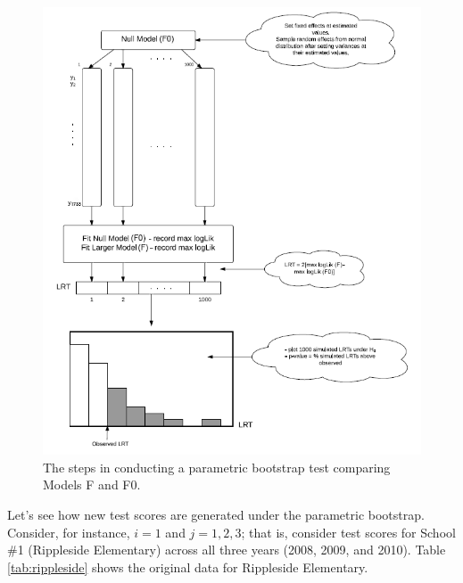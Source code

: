 \documentclass[
]{krantz}
\begin{document}
\begin{figure}
\includegraphics[width=0.9\linewidth]{data/ParametricBootstrapDiagram9} \caption{The steps in conducting a parametric bootstrap test comparing Models F and F0.}\label{fig:parabootdiagram}
\end{figure}

Let's see how new test scores are generated under the parametric bootstrap. Consider, for instance, \(i=1\) and \(j=1,2,3\); that is, consider test scores for School \#1 (Rippleside Elementary) across all three years (2008, 2009, and 2010). Table \ref{tab:rippleside} shows the original data for Rippleside Elementary.

\begin{table}
\centering
\caption{\label{tab:rippleside}Original data for Rippleside Elementary (School 1).}
\centering
{}
\end{table}
\end{document}
